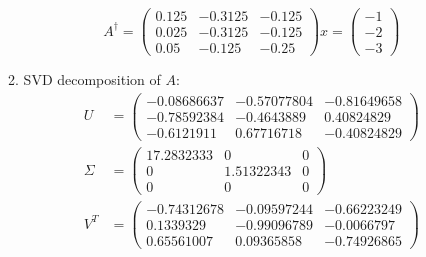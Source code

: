 \documentclass[conference,onecolumn]{IEEEtran}
\begin{document}
\begin{enumerate}[label=\arabic{enumi}.]
\begin{enumerate}
                    $$
                        A^{\dagger} =
                        \begin{pmatrix}
                            0.125 & -0.3125 & -0.125 \\
                            0.025 & -0.3125 & -0.125 \\
                            0.05  & -0.125  & -0.25
                        \end{pmatrix}
                        x =
                        \begin{pmatrix}
                            -1 \\
                            -2 \\
                            -3
                        \end{pmatrix}
                    $$
              \item SVD decomposition of $A$:
                    \begin{align*}
                        U      & =
                        \begin{pmatrix}
                            -0.08686637 & -0.57077804 & -0.81649658 \\
                            -0.78592384 & -0.4643889  & 0.40824829  \\
                            -0.6121911  & 0.67716718  & -0.40824829
                        \end{pmatrix} \\
                        \Sigma & =
                        \begin{pmatrix}
                            17.2832333 & 0          & 0 \\
                            0          & 1.51322343 & 0 \\
                            0          & 0          & 0
                        \end{pmatrix} \\
                        V^T    & =
                        \begin{pmatrix}
                            -0.74312678 & -0.09597244 & -0.66223249 \\
                            0.1339329   & -0.99096789 & -0.0066797  \\
                            0.65561007  & 0.09365858  & -0.74926865
                        \end{pmatrix}
                    \end{align*}


\end{enumerate}
\end{enumerate}
\end{document}
